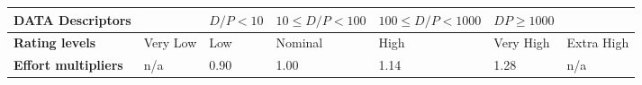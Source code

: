 		\begin{center}
			\begin{tabular}{ | C{2cm} | C{2cm} | C{2cm} | C{2cm} | C{2cm} | C{2cm} | C{2cm} | }
				\hline
				\textbf{DATA Descriptors} & & $D/P < 10 $ & $ 10 \leq D/P < 100$ & $ 100 \leq D/P < 1000$ & $DP \geq 1000$ & \\ \hline
			
				\textbf{Rating levels} & Very Low & Low & Nominal & High & Very High & Extra High\\ \hline
			
				\textbf{Effort multipliers} & n/a & 0.90 & 1.00 & 1.14 & 1.28 & n/a\\ \hline
			\end{tabular}
		\end{center}